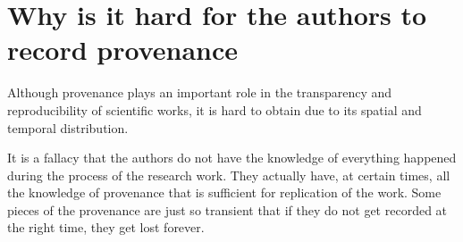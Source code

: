 \section{Why is it hard for the authors to record provenance}
Although provenance plays an important role in the transparency and reproducibility of scientific works, it is hard to obtain due to its spatial and temporal distribution.

It is a fallacy that the authors do not have the knowledge of everything happened during the process of the research work. They actually have, at certain times, all the knowledge of provenance that is sufficient for replication of the work. Some pieces of the provenance are just so transient that if they do not get recorded at the right time, they get lost forever.

